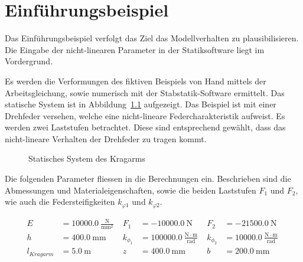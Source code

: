 \documentclass[
  10pt,
  letterpaper,
]{scrreprt}
\begin{document}

\chapter{Einführungsbeispiel}\label{einfuxfchrungsbeispiel}

Das Einführungsbeispiel verfolgt das Ziel das Modellverhalten zu
plausibilisieren. Die Eingabe der nicht-linearen Parameter in der
Statiksoftware liegt im Vordergrund.

Es werden die Verformungen des fiktiven Beispiels von Hand mittels der
Arbeitsgleichung, sowie numerisch mit der Stabstatik-Software ermittelt.
Das statische System ist in Abbildung~\ref{fig-kragarm-feder}
aufgezeigt. Das Beispiel ist mit einer Drehfeder versehen, welche eine
nicht-lineare Federcharakteristik aufweist. Es werden zwei Laststufen
betrachtet. Diese sind entsprechend gewählt, dass das nicht-lineare
Verhalten der Drehfeder zu tragen kommt.

\begin{figure}[H]


\caption{\label{fig-kragarm-feder}Statisches System des Kragarms}

\end{figure}%

Die folgenden Parameter fliessen in die Berechnungen ein. Beschrieben
sind die Abmessungen und Materialeigenschaften, sowie die beiden
Laststufen \(F_1\) und \(F_2\), wie auch die Federsteifigkeiten
\(k_{\varphi1}\) und \(k_{\varphi2}\).

$$
\begin{aligned}
E &= 10000.0\ \frac{\mathrm{N}}{\mathrm{mm}^{2}} \; 
 &F_{1} &= -10000.0\ \mathrm{N} \; 
 &F_{2} &= -21500.0\ \mathrm{N} \; 
\\[12pt]
 h &= 400.0\ \mathrm{mm} \; 
 &k_{\phi_{1}} &= 100000.0\ \frac{\mathrm{N} \cdot \mathrm{m}}{\mathrm{rad}} \; 
 &k_{\phi_{2}} &= 10000.0\ \frac{\mathrm{N} \cdot \mathrm{m}}{\mathrm{rad}} \; 
\\[12pt]
 l_{Kragarm} &= 5.0\ \mathrm{m} \; 
 &z &= 400.0\ \mathrm{mm} \; 
 &b &= 200.0\ \mathrm{mm} \; 
\\[12pt]
\end{aligned}
$$
\end{document}

